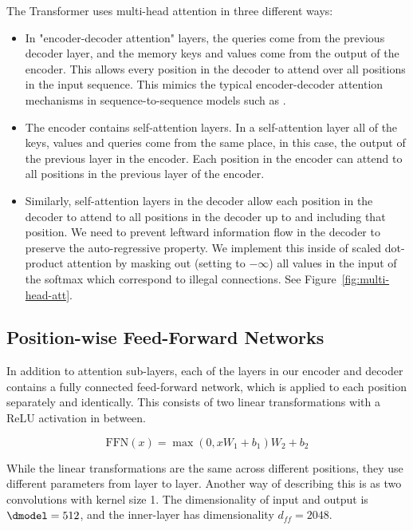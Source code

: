   The Transformer uses multi-head attention in three different ways:
  \begin{itemize}
   \item In "encoder-decoder attention" layers, the queries come from the previous decoder layer, and the memory keys and values come from the output of the encoder.   This allows every position in the decoder to attend over all positions in the input sequence.  This mimics the typical encoder-decoder attention mechanisms in sequence-to-sequence models such as \citep{wu2016google, bahdanau2014neural,JonasFaceNet2017}.

   \item The encoder contains self-attention layers.  In a self-attention layer all of the keys, values and queries come from the same place, in this case, the output of the previous layer in the encoder.   Each position in the encoder can attend to all positions in the previous layer of the encoder.

   \item Similarly, self-attention layers in the decoder allow each position in the decoder to attend to all positions in the decoder up to and including that position.  We need to prevent leftward information flow in the decoder to preserve the auto-regressive property.  We implement this inside of scaled dot-product attention by masking out (setting to $-\infty$) all values in the input of the softmax which correspond to illegal connections.  See Figure~\ref{fig:multi-head-att}.

  \end{itemize}

  \subsection{Position-wise Feed-Forward Networks}\label{sec:ffn}

  In addition to attention sub-layers, each of the layers in our encoder and decoder contains a fully connected feed-forward network, which is applied to each position separately and identically.  This consists of two linear transformations with a ReLU activation in between.

  \begin{equation}
     \mathrm{FFN}(x)=\max(0, xW_1 + b_1) W_2 + b_2
  \end{equation}

  While the linear transformations are the same across different positions, they use different parameters from layer to layer. Another way of describing this is as two convolutions with kernel size 1.  The dimensionality of input and output is $\dmodel=512$, and the inner-layer has dimensionality $d_{ff}=2048$.


